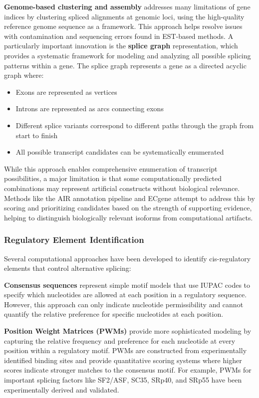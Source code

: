 \documentclass[12pt,a4paper]{article}
\begin{document}
\textbf{Genome-based clustering and assembly} addresses many limitations of gene indices by clustering spliced alignments at genomic loci, using the high-quality reference genome sequence as a framework. This approach helps resolve issues with contamination and sequencing errors found in EST-based methods. A particularly important innovation is the \textbf{splice graph} representation, which provides a systematic framework for modeling and analyzing all possible splicing patterns within a gene. The splice graph represents a gene as a directed acyclic graph where:
\begin{itemize}
    \item Exons are represented as vertices
    \item Introns are represented as arcs connecting exons
    \item Different splice variants correspond to different paths through the graph from start to finish
    \item All possible transcript candidates can be systematically enumerated
\end{itemize}

While this approach enables comprehensive enumeration of transcript possibilities, a major limitation is that some computationally predicted combinations may represent artificial constructs without biological relevance. Methods like the AIR annotation pipeline and ECgene attempt to address this by scoring and prioritizing candidates based on the strength of supporting evidence, helping to distinguish biologically relevant isoforms from computational artifacts.

\subsubsection{Regulatory Element Identification}

Several computational approaches have been developed to identify cis-regulatory elements that control alternative splicing:

\textbf{Consensus sequences} represent simple motif models that use IUPAC codes to specify which nucleotides are allowed at each position in a regulatory sequence. However, this approach can only indicate nucleotide permissibility and cannot quantify the relative preference for specific nucleotides at each position.

\textbf{Position Weight Matrices (PWMs)} provide more sophisticated modeling by capturing the relative frequency and preference for each nucleotide at every position within a regulatory motif. PWMs are constructed from experimentally identified binding sites and provide quantitative scoring systems where higher scores indicate stronger matches to the consensus motif. For example, PWMs for important splicing factors like SF2/ASF, SC35, SRp40, and SRp55 have been experimentally derived and validated.
\end{document}
